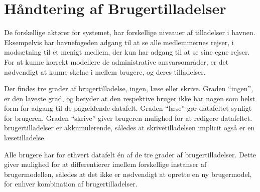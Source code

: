 \section{Håndtering af Brugertilladelser} %
\label{tilladelser}

De forskellige aktører for systemet, har forskellige niveauer af tilladelser i havnen. Eksempelvis har havnefogeden adgang til at se alle medlemmernes rejser, i modsætning til et menigt medlem, der kun har adgang til at se sine egne rejser. For at kunne korrekt modellere de administrative ansvarsområder, er det nødvendigt at kunne skelne i mellem brugere, og deres tilladelser.

Der findes tre grader af brugertilladelse, ingen, læse eller skrive. Graden \enquote{ingen}, er den laveste grad, og betyder at den respektive bruger ikke har nogen som helst form for adgang til de pågældende datafelt. Graden \enquote{læse} gør datafeltet synligt for brugeren. Graden \enquote{skrive} giver brugeren mulighed for at redigere datafeltet. brugertilladelser er akkumulerende, således at skrivetilladelsen implicit også er en læsetilladelse. 

Alle brugere har for ethvert datafelt én af de tre grader af brugertilladelser. Dette giver mulighed for at differentierer imellem forskellige instanser af brugermodellen, således at det ikke er nødvendigt at oprette en ny brugermodel, for enhver kombination af brugertilladelser.

